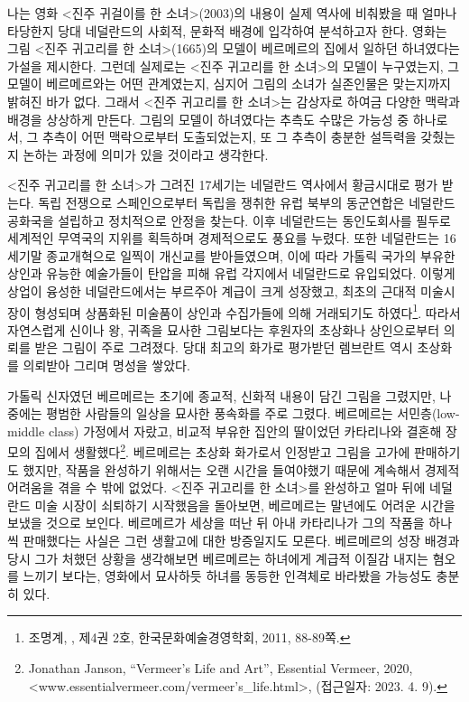 \maketitle

나는 영화 <진주 귀걸이를 한 소녀>(2003)의 내용이 실제 역사에 비춰봤을 때 얼마나 타당한지 당대 네덜란드의 사회적, 문화적 배경에 입각하여 분석하고자 한다. 영화는 그림 <진주 귀고리를 한 소녀>(1665)의 모델이 베르메르의 집에서 일하던 하녀였다는 가설을 제시한다. 그런데 실제로는 <진주 귀고리를 한 소녀>의 모델이 누구였는지, 그 모델이 베르메르와는 어떤 관계였는지, 심지어 그림의 소녀가 실존인물은 맞는지까지 밝혀진 바가 없다. 그래서 <진주 귀고리를 한 소녀>는 감상자로 하여금 다양한 맥락과 배경을 상상하게 만든다. 그림의 모델이 하녀였다는 추측도 수많은 가능성 중 하나로서, 그 추측이 어떤 맥락으로부터 도출되었는지, 또 그 추측이 충분한 설득력을 갖췄는지 논하는 과정에 의미가 있을 것이라고 생각한다.

<진주 귀고리를 한 소녀>가 그려진 17세기는 네덜란드 역사에서 황금시대로 평가 받는다. 독립 전쟁으로 스페인으로부터 독립을 쟁취한 유럽 북부의 동군연합은 네덜란드 공화국을 설립하고 정치적으로 안정을 찾는다. 이후 네덜란드는 동인도회사를 필두로 세계적인 무역국의 지위를 획득하며 경제적으로도 풍요를 누렸다. 또한 네덜란드는 16세기말 종교개혁으로 일찍이 개신교를 받아들였으며, 이에 따라 가톨릭 국가의 부유한 상인과 유능한 예술가들이 탄압을 피해 유럽 각지에서 네덜란드로 유입되었다. 이렇게 상업이 융성한 네덜란드에서는 부르주아 계급이 크게 성장했고, 최초의 근대적 미술시장이 형성되며 상품화된 미술품이 상인과 수집가들에 의해 거래되기도 하였다\footnote{조명계, ,  제4권 2호, 한국문화예술경영학회, 2011, 88-89쪽.}. 따라서 자연스럽게 신이나 왕, 귀족을 묘사한 그림보다는 후원자의 초상화나 상인으로부터 의뢰를 받은 그림이 주로 그려졌다. 당대 최고의 화가로 평가받던 렘브란트 역시 초상화를 의뢰받아 그리며 명성을 쌓았다.

가톨릭 신자였던 베르메르는 초기에 종교적, 신화적 내용이 담긴 그림을 그렸지만, 나중에는 평범한 사람들의 일상을 묘사한 풍속화를 주로 그렸다. 베르메르는 서민층(low-middle class) 가정에서 자랐고, 비교적 부유한 집안의 딸이었던 카타리나와 결혼해 장모의 집에서 생활했다\footnote{Jonathan Janson, ``Vermeer's Life and Art'', Essential Vermeer, 2020, <www.essentialvermeer.com/vermeer's\_life.html>, (접근일자: 2023. 4. 9).}. 베르메르는 초상화 화가로서 인정받고 그림을 고가에 판매하기도 했지만, 작품을 완성하기 위해서는 오랜 시간을 들여야했기 때문에 계속해서 경제적 어려움을 겪을 수 밖에 없었다. <진주 귀고리를 한 소녀>를 완성하고 얼마 뒤에 네덜란드 미술 시장이 쇠퇴하기 시작했음을 돌아보면, 베르메르는 말년에도 어려운 시간을 보냈을 것으로 보인다. 베르메르가 세상을 떠난 뒤 아내 카타리나가 그의 작품을 하나씩 판매했다는 사실은 그런 생활고에 대한 방증일지도 모른다. 베르메르의 성장 배경과 당시 그가 처했던 상황을 생각해보면 베르메르는 하녀에게 계급적 이질감 내지는 혐오를 느끼기 보다는, 영화에서 묘사하듯 하녀를 동등한 인격체로 바라봤을 가능성도 충분히 있다.

